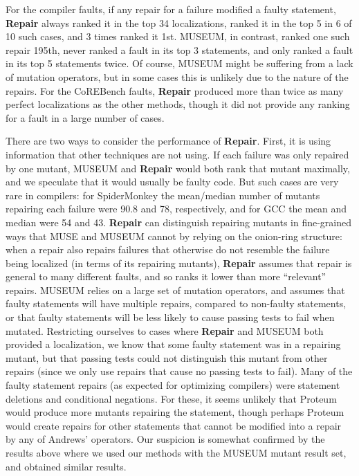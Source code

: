 For the compiler faults, if any repair for a failure modified a faulty statement, {\bf Repair} always ranked it in the top 34 localizations, ranked it in the top 5 in 6 of 10 such cases, and 3 times ranked it 1st.  MUSEUM, in contrast, ranked one such repair 195th, never ranked a fault in its top 3 statements, and only ranked a fault in its top 5 statements twice.  Of course, MUSEUM might be suffering from a lack of mutation operators, but in some cases this is unlikely due to the nature of the repairs.  For the CoREBench faults, {\bf Repair} produced more than twice as many perfect localizations as the other methods, though it did not provide any ranking for a fault in a large number of cases.

There are two ways to consider the performance of {\bf Repair}.  First, it is using information that other techniques are not using.  If each failure was only repaired by one mutant, MUSEUM and {\bf Repair} would both rank that mutant maximally, and we speculate that it would usually be faulty code.  But such cases are very rare in compilers:  for SpiderMonkey the mean/median number of mutants repairing each failure were 90.8 and 78, respectively, and for GCC the mean and median were 54 and 43.  {\bf Repair} can distinguish repairing mutants in fine-grained ways that MUSE and MUSEUM cannot by relying on the onion-ring structure:  when a repair also repairs failures that otherwise do not resemble the failure being localized (in terms of its repairing mutants), {\bf Repair} assumes that repair is general to many different faults, and so ranks it lower than more ``relevant'' repairs.  MUSEUM relies on a large set of mutation operators, and assumes that faulty statements will have multiple repairs, compared to non-faulty statements, or that faulty statements will be less likely to cause passing tests to fail when mutated.  Restricting ourselves to cases where {\bf Repair} and MUSEUM both provided a localization, we know that some faulty statement was in a repairing mutant, but that passing tests could not distinguish this mutant  from other repairs (since we only use repairs that cause no passing tests to fail).  Many of the faulty statement repairs (as expected for optimizing compilers) were statement deletions and conditional negations.  For these, it seems unlikely that Proteum would produce more mutants repairing the statement, though perhaps Proteum would create repairs for other statements that cannot be modified into a repair by any of Andrews' operators.  Our suspicion is somewhat confirmed by the results above where we used our methods with the MUSEUM mutant result set, and obtained similar results.

